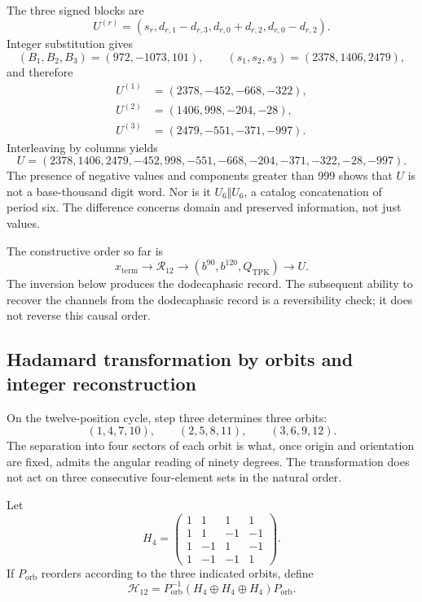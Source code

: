 The three signed blocks are
\begin{equation}
 U^{(r)}=(s_r,d_{r,1}-d_{r,3},d_{r,0}+d_{r,2},d_{r,0}-d_{r,2}).
 \label{eq:k-bloques-firmados}
\end{equation}
Integer substitution gives
\[
 (B_1,B_2,B_3)=(972,-1073,101),\qquad
 (s_1,s_2,s_3)=(2378,1406,2479),
\]
and therefore
\begin{align*}
 U^{(1)}&=(2378,-452,-668,-322),\\
 U^{(2)}&=(1406,998,-204,-28),\\
 U^{(3)}&=(2479,-551,-371,-997).
\end{align*}
Interleaving by columns yields
\begin{equation}
 U=(2378,1406,2479,-452,998,-551,
       -668,-204,-371,-322,-28,-997).
 \label{eq:k-u-firmado}
\end{equation}
The presence of negative values and components greater than 999
shows that \(U\) is not a base-thousand digit word. Nor is it
\(U_6\Vert U_6\), a catalog concatenation of period six. The difference
concerns domain and preserved information, not just values.

The constructive order so far is
\[
 x_{\mathrm{term}}\longrightarrow\mathcal R_{12}
 \longrightarrow(b^{90},b^{120},Q_{\mathrm{TPK}})
 \longrightarrow U.
\]
The inversion below produces the dodecaphasic record. The subsequent ability to recover
the channels from the dodecaphasic record is a reversibility check; it does not
reverse this causal order.

\subsection{Hadamard transformation by orbits and integer reconstruction}
\label{subsec:k-hadamard}

On the twelve-position cycle, step three determines three orbits:
\[
 (1,4,7,10),\qquad(2,5,8,11),\qquad(3,6,9,12).
\]
The separation into four sectors of each orbit is what, once
origin and orientation are fixed, admits the angular reading of ninety degrees. The
transformation does not act on three consecutive four-element sets in the natural order.

Let
\[
 H_4=\begin{pmatrix}
 1&1&1&1\\1&1&-1&-1\\1&-1&1&-1\\1&-1&-1&1
 \end{pmatrix}.
\]
If \(P_{\mathrm{orb}}\) reorders according to the three indicated orbits,
define
\[
 \mathcal H_{12}=P_{\mathrm{orb}}^{-1}
 (H_4\oplus H_4\oplus H_4)P_{\mathrm{orb}}.
\]

